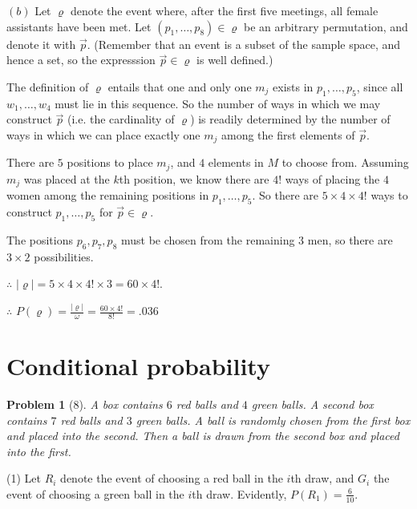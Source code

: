 \documentclass[a4paper, 12pt]{article}
\newtheorem{problem}{Problem}
\newtheorem{problem}{Problem}
\begin{document}
   $(b)$ Let $\varrho$ denote the event where, after the first five meetings,
   all female assistants have been met. Let $(p_1,\ldots, p_8) \in \varrho$ be an arbitrary
   permutation, and denote it with $\overrightarrow{p}$. (Remember that an event is a subset of the sample space, and
   hence a set, so the expresssion $\overrightarrow{p} \in \varrho$ is well defined.)


   The definition of $\varrho$ entails that one and only one $m_j$ exists in $p_1, \ldots, p_5$,
   since all $w_1, \ldots, w_4$ must lie in this sequence. So the number of 
   ways in which we may construct $\overrightarrow{p}$ (i.e. the cardinality 
   of $\varrho$) is readily determined by the number of ways in which we can 
   place exactly one $m_j$ among the first elements of $\overrightarrow{p}$.

   There are $5$ positions to place $m_j$, and $4$ elements in $M$ to choose
   from. Assuming $m_j$ was placed at the $k$th position, we know there are
   $4!$ ways of placing the $4$ women among the remaining positions in $p_1,
   \ldots, p_5$. So there are $5 \times 4 \times 4!$ ways to construct $p_1,
   \ldots, p_5$ for $\overrightarrow{p} \in \varrho$. 

   The positions $p_6, p_7, p_8$ must be chosen from the remaining 
   $3$ men, so there are $3 \times 2$ possibilities. 

   $\therefore $ $|\varrho| = 5\times 4 \times 4! \times 3 = 60 \times 4!$.

   $\therefore $ $P(\varrho) =  \frac{ |\varrho| }{\omega} = \frac{60 \times 4!}{8!} = .036$
  
   \pagebreak

   \section{Conditional probability} 

   \begin{problem}[8]
       A box contains $6$ red balls and $4$ green balls. A second box contains 
       $7$ red balls and $3$ green balls. A ball is randomly chosen from 
       the first box and placed into the second. Then a ball is drawn 
       from the second box and placed into the first.
   \end{problem}


   (1) Let $R_i$ denote the event of choosing a red ball in the $i$th draw, and
   $G_i$ the event of choosing a green ball in the $i$th draw. Evidently,
   $P(R_1) = \frac{6}{10}$. 
\end{document}
